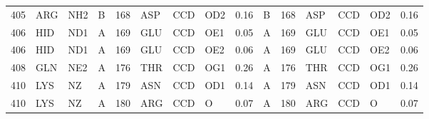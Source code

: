 \begin{longtable}{rlllrlllrlrlllr}
       405 & ARG        & NH2    & B         &         168 & ASP          & CCD         & OD2      &          0.16 & B         &         168 & ASP          & CCD         & OD2      &          0.16 \\
       406 & HID        & ND1    & A         &         169 & GLU          & CCD         & OE1      &          0.05 & A         &         169 & GLU          & CCD         & OE1      &          0.05 \\
       406 & HID        & ND1    & A         &         169 & GLU          & CCD         & OE2      &          0.06 & A         &         169 & GLU          & CCD         & OE2      &          0.06 \\
       408 & GLN        & NE2    & A         &         176 & THR          & CCD         & OG1      &          0.26 & A         &         176 & THR          & CCD         & OG1      &          0.26 \\
       410 & LYS        & NZ     & A         &         179 & ASN          & CCD         & OD1      &          0.14 & A         &         179 & ASN          & CCD         & OD1      &          0.14 \\
       410 & LYS        & NZ     & A         &         180 & ARG          & CCD         & O        &          0.07 & A         &         180 & ARG          & CCD         & O        &          0.07 \\
\hline
\end{longtable}